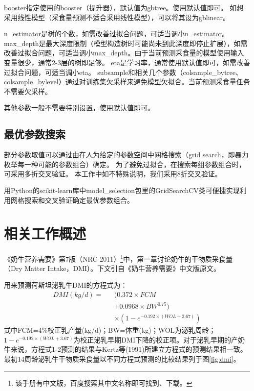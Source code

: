 booster指定使用的booster（提升器），默认值为gbtree。使用默认值即可。
如想采用线性模型（采食量预测不适合采用线性模型），可以将其设为gblinear。

n\_estimator是树的个数，如需改善过拟合问题，可适当调小n\_estimator。
max\_depth是最大深度限制（模型构造树时可能尚未到此深度即停止扩展），如需改善过拟合问题，可适当调小max\_depth。由于当前预测采食量的模型使用输入变量很少，通常2-3层的树即足够。
eta是学习率，通常使用默认值即可，如需改善过拟合问题，可适当调小eta。
subsample和相关几个参数（colsample\_bytree、colsample\_bylevel）通过对训练集欠采样来避免模型欠拟合。当前预测采食量任务不需要欠采样。

其他参数一般不需要特别设置，使用默认值即可。

\subsection{最优参数搜索}
\label{best_para}

部分参数取值可以通过由在人为给定的参数空间中网格搜索（grid search，即暴力枚举每一种可能的参数组合）确定。
为了避免过拟合，在搜索每组参数组合时，可采用多折交叉验证。
本工作中如不特殊说明，我们采用8折交叉验证。

用Python的scikit-learn库中model\_selection包里的GridSearchCV类\cite{grid_search}可便捷实现利用网格搜索和交叉验证确定最优参数组合。



\section{相关工作概述}
\label{related}

《奶牛营养需要》第7版（NRC 2011）\footnote{该手册有中文版，百度搜索其中文名称即可找到、下载。}\cite{USA2001Nutrient}中，第一章讨论奶牛的干物质采食量（Dry Matter Intake，DMI）。下文引自《奶牛营养需要》中文版原文。

用来预测荷斯坦泌乳牛DMI的方程式为：
\begin{eqnarray}
\label{eqn:dmi}
	 \nonumber DMI (kg/d) =&&(0.372  \times FCM \\
	 \nonumber &&+  0.0968 \times  BW^{0.75}) \\
	&&\times (1 - e^{-0.192 \times(WOL + 3.67)})
\end{eqnarray}
式中FCM=4\%校正乳产量(kg/d)；BW=体重(kg)；WOL为泌乳周龄；$1-e^{-0.192\times(WOL+3.67)}$为校正泌乳早期DMI下降的校正项。对于泌乳早期的产奶牛来说，方程式1-2预测的结果与Kertz等(1991)所建立方程式的预测结果相一致。最初14周龄泌乳牛干物质采食量以不同方程式预测的比较结果列于图\ref{fig:dmi}。

